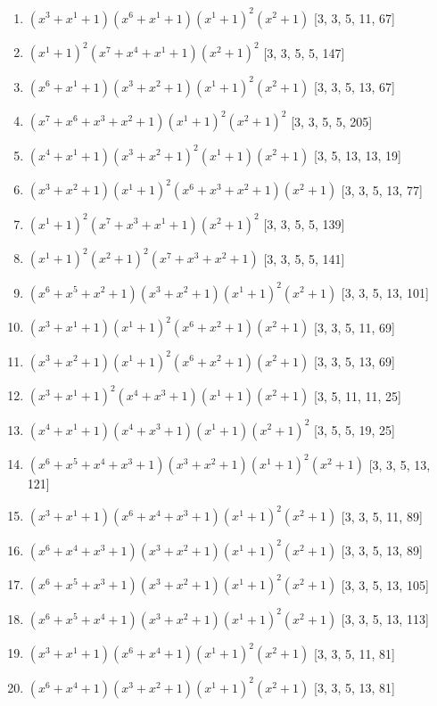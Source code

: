 \documentclass[10pt,twocolumn]{article}
\begin{document}
\begin{enumerate}
\item $(x^{3} + x^{1} + 1)(x^{6} + x^{1} + 1)(x^{1} + 1)^{2}(x^{2} + 1)$  [3, 3, 5, 11, 67]
\item $(x^{1} + 1)^{2}(x^{7} + x^{4} + x^{1} + 1)(x^{2} + 1)^{2}$  [3, 3, 5, 5, 147]
\item $(x^{6} + x^{1} + 1)(x^{3} + x^{2} + 1)(x^{1} + 1)^{2}(x^{2} + 1)$  [3, 3, 5, 13, 67]
\item $(x^{7} + x^{6} + x^{3} + x^{2} + 1)(x^{1} + 1)^{2}(x^{2} + 1)^{2}$  [3, 3, 5, 5, 205]
\item $(x^{4} + x^{1} + 1)(x^{3} + x^{2} + 1)^{2}(x^{1} + 1)(x^{2} + 1)$  [3, 5, 13, 13, 19]
\item $(x^{3} + x^{2} + 1)(x^{1} + 1)^{2}(x^{6} + x^{3} + x^{2} + 1)(x^{2} + 1)$  [3, 3, 5, 13, 77]
\item $(x^{1} + 1)^{2}(x^{7} + x^{3} + x^{1} + 1)(x^{2} + 1)^{2}$  [3, 3, 5, 5, 139]
\item $(x^{1} + 1)^{2}(x^{2} + 1)^{2}(x^{7} + x^{3} + x^{2} + 1)$  [3, 3, 5, 5, 141]
\item $(x^{6} + x^{5} + x^{2} + 1)(x^{3} + x^{2} + 1)(x^{1} + 1)^{2}(x^{2} + 1)$  [3, 3, 5, 13, 101]
\item $(x^{3} + x^{1} + 1)(x^{1} + 1)^{2}(x^{6} + x^{2} + 1)(x^{2} + 1)$  [3, 3, 5, 11, 69]
\item $(x^{3} + x^{2} + 1)(x^{1} + 1)^{2}(x^{6} + x^{2} + 1)(x^{2} + 1)$  [3, 3, 5, 13, 69]
\item $(x^{3} + x^{1} + 1)^{2}(x^{4} + x^{3} + 1)(x^{1} + 1)(x^{2} + 1)$  [3, 5, 11, 11, 25]
\item $(x^{4} + x^{1} + 1)(x^{4} + x^{3} + 1)(x^{1} + 1)(x^{2} + 1)^{2}$  [3, 5, 5, 19, 25]
\item $(x^{6} + x^{5} + x^{4} + x^{3} + 1)(x^{3} + x^{2} + 1)(x^{1} + 1)^{2}(x^{2} + 1)$  [3, 3, 5, 13, 121]
\item $(x^{3} + x^{1} + 1)(x^{6} + x^{4} + x^{3} + 1)(x^{1} + 1)^{2}(x^{2} + 1)$  [3, 3, 5, 11, 89]
\item $(x^{6} + x^{4} + x^{3} + 1)(x^{3} + x^{2} + 1)(x^{1} + 1)^{2}(x^{2} + 1)$  [3, 3, 5, 13, 89]
\item $(x^{6} + x^{5} + x^{3} + 1)(x^{3} + x^{2} + 1)(x^{1} + 1)^{2}(x^{2} + 1)$  [3, 3, 5, 13, 105]
\item $(x^{6} + x^{5} + x^{4} + 1)(x^{3} + x^{2} + 1)(x^{1} + 1)^{2}(x^{2} + 1)$  [3, 3, 5, 13, 113]
\item $(x^{3} + x^{1} + 1)(x^{6} + x^{4} + 1)(x^{1} + 1)^{2}(x^{2} + 1)$  [3, 3, 5, 11, 81]
\item $(x^{6} + x^{4} + 1)(x^{3} + x^{2} + 1)(x^{1} + 1)^{2}(x^{2} + 1)$  [3, 3, 5, 13, 81]

\end{enumerate}
\end{document}

